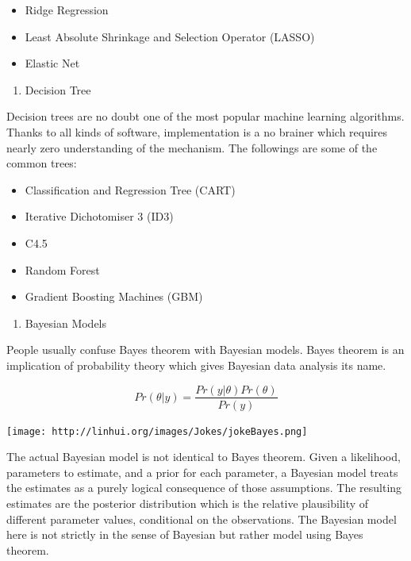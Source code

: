\documentclass[]{book}
\providecommand{\tightlist}{%
  \setlength{\itemsep}{0pt}\setlength{\parskip}{0pt}}
\theoremstyle{definition}
\theoremstyle{definition}
\theoremstyle{remark}
\begin{document}
\begin{itemize}
\tightlist
\item
  Ridge Regression
\item
  Least Absolute Shrinkage and Selection Operator (LASSO)
\item
  Elastic Net
\end{itemize}

\begin{enumerate}
\def\labelenumi{\arabic{enumi}.}
\setcounter{enumi}{4}
\tightlist
\item
  Decision Tree
\end{enumerate}

Decision trees are no doubt one of the most popular machine learning
algorithms. Thanks to all kinds of software, implementation is a no
brainer which requires nearly zero understanding of the mechanism. The
followings are some of the common trees:

\begin{itemize}
\tightlist
\item
  Classification and Regression Tree (CART)
\item
  Iterative Dichotomiser 3 (ID3)
\item
  C4.5
\item
  Random Forest
\item
  Gradient Boosting Machines (GBM)
\end{itemize}

\begin{enumerate}
\def\labelenumi{\arabic{enumi}.}
\setcounter{enumi}{5}
\tightlist
\item
  Bayesian Models
\end{enumerate}

People usually confuse Bayes theorem with Bayesian models. Bayes theorem
is an implication of probability theory which gives Bayesian data
analysis its name.

\[Pr(\theta|y)=\frac{Pr(y|\theta)Pr(\theta)}{Pr(y)}\]

\texttt{[image: http://linhui.org/images/Jokes/jokeBayes.png]}

The actual Bayesian model is not identical to Bayes theorem. Given a
likelihood, parameters to estimate, and a prior for each parameter, a
Bayesian model treats the estimates as a purely logical consequence of
those assumptions. The resulting estimates are the posterior
distribution which is the relative plausibility of different parameter
values, conditional on the observations. The Bayesian model here is not
strictly in the sense of Bayesian but rather model using Bayes theorem.
\end{document}
